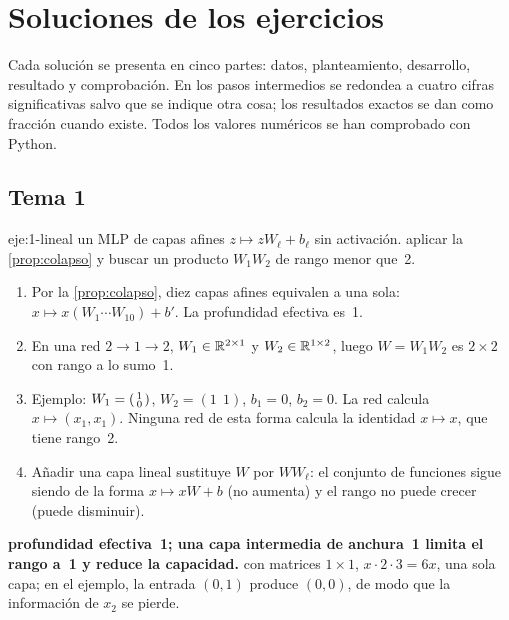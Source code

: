 \chapter{Soluciones de los ejercicios}
\label{ap:soluciones}

Cada solución se presenta en cinco partes: datos, planteamiento, desarrollo, resultado y comprobación. En los pasos intermedios se redondea a cuatro cifras significativas salvo que se indique otra cosa; los resultados exactos se dan como fracción cuando existe. Todos los valores numéricos se han comprobado con Python.

\section{Tema 1}

\begin{solucion}{eje:1-lineal}
\datos un MLP de capas afines $z\mapsto zW_\ell+b_\ell$ sin activación.
\planteamiento aplicar la \cref{prop:colapso} y buscar un producto $W_1W_2$ de rango menor que~2.
\pasos
\begin{enumerate}[label=\arabic*.]
  \item Por la \cref{prop:colapso}, diez capas afines equivalen a una sola: $x\mapsto x(W_1\cdots W_{10})+b'$. La profundidad efectiva es~1.
  \item En una red $2\to 1\to 2$, $W_1\in\mathbb{R}^{2\times 1}$ y $W_2\in\mathbb{R}^{1\times 2}$, luego $W=W_1W_2$ es $2\times 2$ con rango a lo sumo~1.
  \item Ejemplo: $W_1=\begin{psmallmatrix}1\\0\end{psmallmatrix}$, $W_2=(1\ \ 1)$, $b_1=0$, $b_2=0$. La red calcula $x\mapsto(x_1,x_1)$. Ninguna red de esta forma calcula la identidad $x\mapsto x$, que tiene rango~2.
  \item Añadir una capa lineal sustituye $W$ por $WW_{\ell}$: el conjunto de funciones sigue siendo de la forma $x\mapsto xW+b$ (no aumenta) y el rango no puede crecer (puede disminuir).
\end{enumerate}
\resultado \textbf{profundidad efectiva~1; una capa intermedia de anchura~1 limita el rango a~1 y reduce la capacidad.}
\comprobacion con matrices $1\times 1$, $x\cdot 2\cdot 3=6x$, una sola capa; en el ejemplo, la entrada $(0,1)$ produce $(0,0)$, de modo que la información de $x_2$ se pierde.
\end{solucion}

